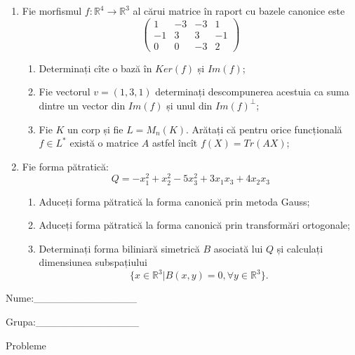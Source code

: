 \documentclass{article}
\begin{document}
\begin{enumerate}
 \item Fie morfismul $f:\mathbb{R}^4 \to \mathbb{R}^3$ al cărui matrice în raport cu bazele canonice este
$$\begin{pmatrix}
1&-3&-3&1\\
-1&3&3&-1\\
0&0&-3&2
\end{pmatrix}$$

\begin{enumerate}
\item Determinați cîte o bază în $Ker(f)$ și $Im(f)$;
\item Fie vectorul $v=(1,3,1)$ determinați descompunerea acestuia ca suma dintre un vector din $Im(f)$ și unul din $Im(f)^\perp$;
\item Fie $K$ un corp și fie $L=M_n(K)$. Arătați că pentru orice funcțională $f \in L^*$ există o matrice $A$ astfel încît $f(X)=Tr(AX)$;
\end{enumerate}
\item Fie forma pătratică:
$$Q= -x_1^2+x_2^2-5x_3^2+3x_1x_3+4x_2x_3$$

\begin{enumerate}
\item Aduceți forma pătratică la forma canonică prin metoda Gauss;
\item Aduceți forma pătratică la forma canonică prin transformări ortogonale;
\item Determinați forma biliniară simetrică $B$ asociată lui $Q$ și calculați dimensiunea subspațiului
$$\{x \in \mathbb{R}^3 | B(x,y)=0,\forall y \in \mathbb{R}^3\}.$$

\end{enumerate}
\end{enumerate}
\newpage
\begin{flushright}
Nume:\_\_\_\_\_\_\_\_\_\_\_\_\_\_
 
 
Grupa:\_\_\_\_\_\_\_\_\_\_\_\_\_\_
\end{flushright}
\begin{center}
\vspace{2cm}
{\Large Probleme}
\vspace{2cm}
\end{center}
\end{document}
